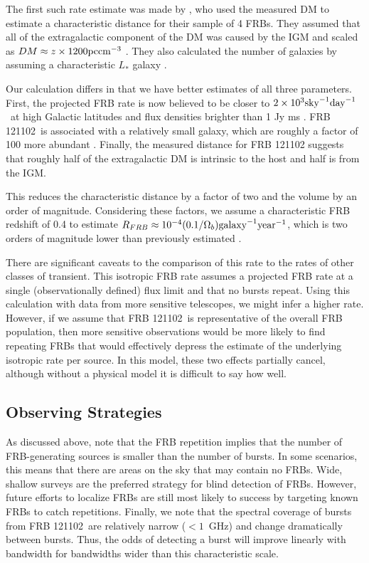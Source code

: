 \documentclass[twocolumn]{aastex61}
\newcommand{\frb}{FRB 121102}
\begin{document}
The first such rate estimate was made by \citet{2013Sci...341...53T}, who used the measured DM to estimate a characteristic distance for their sample of 4 FRBs. They assumed that all of the extragalactic component of the DM was caused by the IGM and scaled as $DM\approx z\times1200 \rm{pc} \rm{cm}^{-3}$ \citep{2003ApJ...598L..79I,2004MNRAS.348..999I}. They also calculated the number of galaxies by assuming a characteristic $L_*$ galaxy \citep[corresponding to stellar mass $M_* \approx 1010.66 M$][]{2012MNRAS.421..621B}.

Our calculation differs in that we have better estimates of all three parameters. First, the projected FRB rate is now believed to be closer to $2\times10^3 \rm{sky}^{-1} \rm{day}^{-1}$\ at high Galactic latitudes and flux densities brighter than 1 Jy ms \citep{2016arXiv161100458L,2016MNRAS.460L..30C}. \frb\ is associated with a relatively small galaxy, which are roughly a factor of 100 more abundant \citep[$\Phi(M) \approx 10^{-2} \rm{Mpc}^{-3}$;][]{2007ApJ...665..265F}. Finally, the measured distance for FRB 121102 suggests that roughly half of the extragalactic DM is intrinsic to the host and half is from the IGM.

This reduces the characteristic distance by a factor of two and the volume by an order of magnitude. Considering these factors, we assume a characteristic FRB redshift of 0.4 to estimate $R_{FRB} \approx 10^{-4} (0.1/\Omega_b) \rm{galaxy}^{-1} \rm{year}^{-1}$, which is two orders of magnitude lower than previously estimated \citep[assuming isotropic radiation;]{2013Sci...341...53T}.

There are significant caveats to the comparison of this rate to the rates of other classes of transient. This isotropic FRB rate assumes a projected FRB rate at a single (observationally defined) flux limit and that no bursts repeat. Using this calculation with data from more sensitive telescopes, we might infer a higher rate. However, if we assume that \frb\ is representative of the overall FRB population, then more sensitive observations would be more likely to find repeating FRBs that would effectively depress the estimate of the underlying isotropic rate per source. In this model, these two effects partially cancel, although without a physical model it is difficult to say how well.

\subsection{Observing Strategies}
As discussed above, \citet{2016MNRAS.458L..89C} note that the FRB repetition implies that the number of FRB-generating sources is smaller than the number of bursts. In some scenarios, this means that there are areas on the sky that may contain no FRBs. Wide, shallow surveys are the preferred strategy for blind detection of FRBs. However, future efforts to localize FRBs are still most likely to success by targeting known FRBs to catch repetitions. Finally, we note that the spectral coverage of bursts from \frb\ are relatively narrow ($<1$~GHz) and change dramatically between bursts. Thus, the odds of detecting a burst will improve linearly with bandwidth for bandwidths wider than this characteristic scale.
\end{document}
